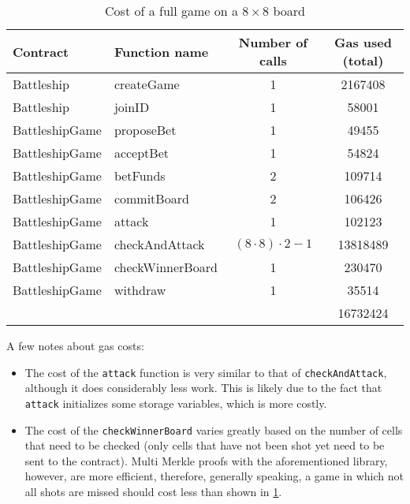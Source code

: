 \begin{table}
	\caption{Cost of a full game on a $8 \times 8$ board}
	\label{tab:full_game_gas_cost}
	\begin{center}
		\begin{tabular}[c]{llcc}\toprule
			Contract       & Function name    & Number of calls           & Gas used (total) \\\midrule
			Battleship     & createGame       & 1                         & 2167408          \\
			Battleship     & joinID           & 1                         & 58001            \\
			BattleshipGame & proposeBet       & 1                         & 49455            \\
			BattleshipGame & acceptBet        & 1                         & 54824            \\
			BattleshipGame & betFunds         & 2                         & 109714           \\
			BattleshipGame & commitBoard      & 2                         & 106426           \\
			BattleshipGame & attack           & 1                         & 102123           \\
			BattleshipGame & checkAndAttack   & $(8 \cdot 8) \cdot 2 - 1$ & 13818489         \\
			BattleshipGame & checkWinnerBoard & 1                         & 230470           \\
			BattleshipGame & withdraw         & 1                         & 35514            \\\hline
			               &                  &                           & 16732424         \\\bottomrule
		\end{tabular}
	\end{center}
\end{table}

A few notes about gas costs:
\begin{itemize}
	\item The cost of the \texttt{attack} function is very similar to that
	      of \texttt{checkAndAttack}, although it does considerably less
	      work. This is likely due to the fact that \texttt{attack}
	      initializes some storage variables, which is more costly.
	\item The cost of the \texttt{checkWinnerBoard} varies greatly based on
	      the number of cells that need to be checked (only cells that have not been shot
	      yet need to be sent to the contract). Multi Merkle proofs with the
	      aforementioned library, however, are more efficient, therefore, generally
	      speaking, a game in which not all shots are missed should cost less than shown
	      in \cref{tab:full_game_gas_cost}.
\end{itemize}

